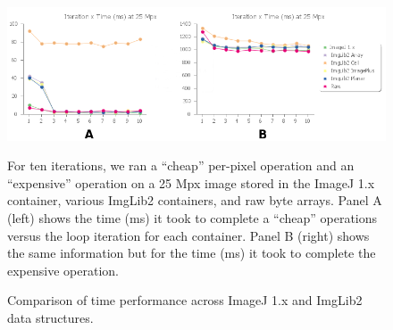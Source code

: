 \documentclass{bmcart}
\begin{document}
\begin{backmatter}
  \begin{figure}[h!]
    \caption{Comparison of time performance across ImageJ 1.x and ImgLib2 data
    structures.}
    \includegraphics[width=4.75in,natwidth=776,natheight=274]{figure-s.2/figure-labeled.png}
    \begin{flushleft}
      For ten iterations, we ran a ``cheap'' per-pixel operation and an
      ``expensive'' operation on a 25 Mpx image stored in the ImageJ 1.x
      container, various ImgLib2 containers, and raw byte arrays. Panel A
      (left) shows the time (ms) it took to complete a ``cheap'' operations
      versus the loop iteration for each container. Panel B (right) shows the
      same information but for the time (ms) it took to complete the expensive
      operation.
    \end{flushleft}
  \end{figure}


\end{backmatter}
\end{document}

